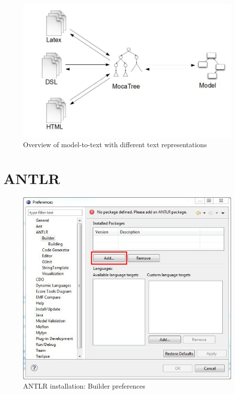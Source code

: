 \begin{figure}[htp]
\begin{center}
 \includegraphics[width=\textwidth]{pics/moca/text-all}
  \caption{Overview of model-to-text with different text representations}
  \label{moca-text-all}
\end{center}
\end{figure}

\section{ANTLR}

\begin{figure}[htp]
\begin{center}
 \includegraphics[width=\textwidth]{pics/moca/0Install/1-antlr-package}
  \caption{ANTLR installation: Builder preferences}
  \label{moca-1-antlr-package}
\end{center}
\end{figure}

